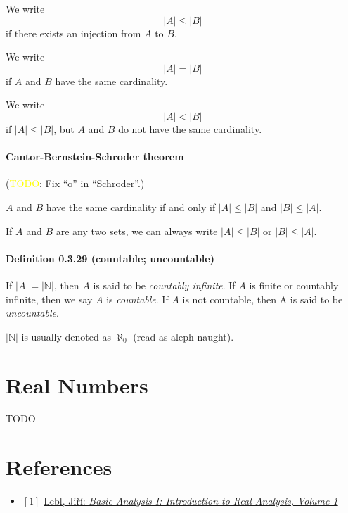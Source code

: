 \documentclass[12pt, letterpaper, oneside]{book}
\begin{document}
We write \[|A| \leq |B|\] if there exists an injection from $A$ to $B$.

We write \[|A| = |B|\] if $A$ and $B$ have the same cardinality.

We write \[|A| < |B|\] if $|A| \leq |B|$, but $A$ and $B$ do not have the same
cardinality.

\subsubsection*{Cantor-Bernstein-Schroder theorem}

(\colorbox{red!100}{\textcolor{yellow}{TODO}}: Fix ``o'' in ``Schroder''.)

$A$ and $B$ have the same cardinality if and only if $|A| \leq |B|$ and $|B|
\leq |A|$.

If $A$ and $B$ are any two sets, we can always write $|A| \leq |B|$ or $|B|
\leq |A|$.

\subsubsection*{Definition 0.3.29 (countable; uncountable)}

If $|A| = |\mathbb{N}|$, then $A$ is said to be \textit{countably infinite}. If
$A$ is finite or countably infinite, then we say $A$ is \textit{countable}. If
$A$ is not countable, then A is said to be \textit{uncountable}.

$|\mathbb{N}|$ is usually denoted as $\aleph_0$ (read as aleph-naught).

%
%

\chapter{Real Numbers}

TODO

\chapter*{References}

\begin{itemize}
  \item $[1]$ \href{https://ocw.mit.edu/courses/18-100a-real-analysis-fall-2020/resources/mit18_100af20_basic_analysis/}{Lebl, Jiří: \it{Basic Analysis I: Introduction to Real Analysis, Volume 1}}
\end{itemize}
\end{document}
